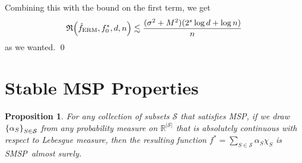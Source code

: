\documentclass[11pt]{article}
\newtheorem{proposition}[theorem]{Proposition}
\DeclarePairedDelimiter{\braces}{\lbrace}{\rbrace}
\DeclarePairedDelimiter{\paren}{(}{)}
\DeclarePairedDelimiter{\norm}{\|}{\|}
\newcommand{\R}{\mathbb{R}}
\newcommand{\cell}{\mathcal{C}}
\newcommand{\binspace}{\braces{\pm 1}^\nfeats}
\newcommand{\nfeats}{d}
\newcommand{\nsamples}{n}
\newcommand{\cellfeatindices}{J}
\newcommand{\MSP}{\textsf{MSP}}
\newcommand{\ferm}{\hat{f}_{\operatorname{ERM}}}
\newcommand{\monomial}{\chi}
\newcommand{\fcoefs}{\mathcal{S}}
\newcommand{\stabmsp}{\textsf{SMSP}}
\newcommand{\objective}{\mathfrak{R}}
\begin{document}
    Combining this with the bound on the first term, we get
    \begin{equation}
        \objective\paren*{\ferm, f^*_0,\nfeats,\nsamples} \lesssim \frac{(\sigma^2+M^2)(2^s\log\nfeats + \log\nsamples)}{n}
    \end{equation}
    as we wanted. \qed




\section{Stable MSP Properties}
\label{sec:stable_msp}


\begin{proposition}
\label{prop:genericity}
    For any collection of subsets $\fcoefs$ that satisfies \MSP, if we draw $\braces*{\alpha_S}_{S \in \fcoefs}$ from any probability measure on $\R^{|\fcoefs|}$ that is absolutely continuous with respect to Lebesgue measure, then the resulting function $f^* = \sum_{S \in \fcoefs} \alpha_S \monomial_S$ is \stabmsp~almost surely.
\end{proposition}
\end{document}
